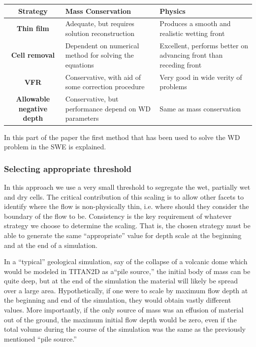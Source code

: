 \documentclass[letterpaper,10pt]{article}
\begin{document}
\begin{center}\label{table1}
\begin{tabular}{|c|p{5cm}|p{5cm}|}
 
\hline
{\bf Strategy}                  & {\bf Mass Conservation}                                          & {\bf Physics} \\
\hline
{\bf Thin film}                 & Adequate, but requires solution reconstruction 
& Produces a smooth and realistic wetting front     \\
\hline 
{\bf Cell removal}              & Dependent on numerical method for solving the equations          & Excellent, performs better on advancing front than receding front \\
\hline
{\bf VFR}                       & Conservative, with aid of some correction procedure              & Very good in wide verity of problems      \\
\hline
{\bf Allowable negative depth}  & Conservative, but performance depend on WD parameters            & Same as mass conservation      \\
\hline
\end{tabular}
\end{center}
In this part of the paper the first method that has been used to solve the WD problem in the SWE is explained.
\subsubsection{Selecting appropriate threshold} \label{Threshold}
In this approach we use a very small threshold to segregate the wet, partially wet and dry cells.
The critical contribution of this scaling is to allow other
facets to identify where the flow %
is non-physically thin, i.e. where should they consider the boundary of
the flow to be. Consistency is the key requirement of whatever strategy we choose to
determine the scaling. That is, the
chosen strategy must be able to generate the same ``appropriate'' value
for depth scale at the beginning and at the end of a simulation.  \newline

In a ``typical'' geological simulation, say of the collapse of a volcanic 
dome which would be modeled in TITAN2D as a``pile source,'' the initial 
body of mass can be quite deep, but at the end of the simulation the 
material will likely be spread over a large area.  Hypothetically, if one 
were to scale by maximum flow depth at the beginning and end of the 
simulation, they would obtain vastly different values.  More importantly, 
if the only source of mass was an effusion of material out of the ground, 
the maximum initial flow depth would be zero, even if the total volume 
during the course of the simulation was the same as the previously 
mentioned ``pile source.''  \newline
\end{document}

